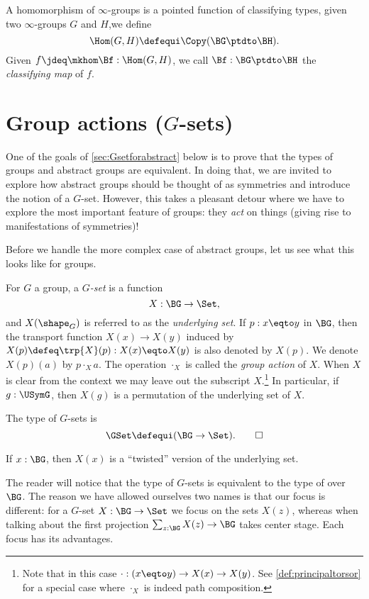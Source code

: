 \begin{definition}
  A homomorphism of $\infty$-groups is a pointed function of classifying types, \ie
  given two $\infty$-groups $G$ and $H$,we define
  \[
    \Hom(G,H)\defequi\Copy(\BG\ptdto\BH).
  \]
  Given $f \jdeq \mkhom\Bf: \Hom(G,H)$, we call
  $\Bf : \BG\ptdto\BH$ the \emph{classifying map} of $f$.
\end{definition}

\section{Group actions ($G$-sets)}
\label{sec:gsets}

One of the goals of \cref{sec:Gsetforabstract} below
is to prove that the types of groups and abstract groups are equivalent.
In doing that, we are invited to explore how abstract groups should be thought of as symmetries and introduce the notion of a $G$-set.
However, this takes a pleasant detour where we have to explore the most important feature of groups: they \emph{act} on things (giving rise to manifestations of symmetries)!

Before we handle the more complex case of abstract groups,
let us see what this looks like for groups.

\begin{definition}
  For $G$ a group, a \emph{$G$-set} is a function
  \[
    X : \BG\to\Set,
  \]
  and $X(\shape_G)$ is referred to as the \emph{underlying set}.
  If $p:x\eqto y$ in $\BG$,
  then the transport function $X(x)\to X(y)$ induced
  by $X(p)\defeq\trp{X}(p) : X(x)\eqto X(y)$ is also denoted by $X(p)$.
  We denote $X(p)(a)$ by $p\cdot_X a$.
  The operation $\cdot_X$ is called the \emph{group action} of $X$.
  When $X$ is clear from the context we may leave out the
  subscript $X$.\footnote{%
    Note that in this case $\cdot: (x\eqto y) \to X(x) \to X(y)$.
    See \cref{def:principaltorsor} for a special case
    where $\cdot_X$ is indeed path composition.}
  In particular, if $g:\USymG$,
  then $X(g)$ is a permutation of the underlying set of $X$.

  The type of $G$-sets is
  \[
    \GSet\defequi(\BG\to\Set).\qedhere
  \]
\end{definition}
If $x:\BG$, then $X(x)$ is a ``twisted'' version of the underlying set.
\begin{remark}
  The reader will notice that the type of $G$-sets is equivalent to the
type of \coverings over $\BG$.
The reason we have allowed ourselves two names is that our focus is different: for a $G$-set $X:\BG\to\Set$ we focus on the sets $X(z)$, whereas when talking about \coverings the first projection $\sum_{z:\BG}X(z)\to \BG$ takes center stage.  Each focus has its advantages.
\end{remark}

